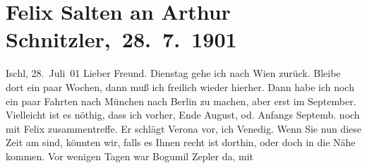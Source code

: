 

         
         \renewcommand{\erwaehntePersonen}{Personen: Friedrich von Bodenstedt, Hugo Felix, Felix Salten, Mirzä Şäfi Vazeh, Josef Willomitzer, Bogumil Zepler}
         \renewcommand{\erwaehnteOrte}{Orte: Bad Ischl, Berlin, Jung-Wiener Theater zum Lieben Augustin, Lago di Garda, München, Vahrn, Venedig, Verona, Wien}
         \renewcommand{\erwaehnteWerke}{Werke: Der einsame Weg. Schauspiel in fünf Akten, Die Gedenktafel der Prinzessin Anna, Die Insel. Monatsschrift mit Buchschmuck und Illustrationen, Hafisa, Neue Loreley}
               \section[ Felix Salten an Arthur Schnitzler, 28. 7. 1901]{ Felix Salten an Arthur Schnitzler, 28. 7. 1901}\nopagebreak{}\rehead{ }\begin{ledgroupsized}[t]{13cm}\normalsize\beginnumbering \toendnotes[C]{\smallbreak\pagebreak[2]} 
\toendnotes[C]{\smallbreak}\pstart
           \raggedleft{}{\pb}Ischl, 28. Juli 01\pend
           \pstart
           Lieber Freund.{ }Dienstag gehe ich nach Wien zurück. Bleibe dort ein paar Wochen, dann muß ich freilich wieder
               hierher. Dann habe ich noch ein paar Fahrten nach München nach Berlin zu
               machen, aber erst im September. Vielleicht ist es nöthig,
               dass ich vorher, Ende August, od. Anfangs Septemb. noch mit Felix zusammentreffe. Er schlägt Verona vor, ich Venedig.
               Wenn Sie nun diese Zeit am \label{K_L03316-1v}\label{K_L03316-1h} sind,
               könnten wir, falls es Ihnen recht ist dorthin, oder doch in die Nähe kommen. Vor
               wenigen Tagen war Bogumil Zepler da, mit

\end{ledgroupsized}
